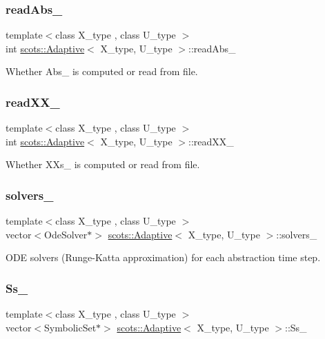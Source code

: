 \subsubsection{\texorpdfstring{read\+Abs\+\_\+}{readAbs\_}}
{\footnotesize\ttfamily template$<$class X\+\_\+type , class U\+\_\+type $>$ \\
int \hyperlink{classscots_1_1Adaptive}{scots\+::\+Adaptive}$<$ X\+\_\+type, U\+\_\+type $>$\+::read\+Abs\+\_\+}

Whether Abs\+\_\+ is computed or read from file. \mbox{\label{classscots_1_1Adaptive_a95926f102459b6ec3525040c791ff359}} 
\subsubsection{\texorpdfstring{read\+X\+X\+\_\+}{readXX\_}}
{\footnotesize\ttfamily template$<$class X\+\_\+type , class U\+\_\+type $>$ \\
int \hyperlink{classscots_1_1Adaptive}{scots\+::\+Adaptive}$<$ X\+\_\+type, U\+\_\+type $>$\+::read\+X\+X\+\_\+}

Whether X\+Xs\+\_\+ is computed or read from file. \mbox{\label{classscots_1_1Adaptive_a0b300511b5f746c7b24ead30dc0ca9ac}} 
\subsubsection{\texorpdfstring{solvers\+\_\+}{solvers\_}}
{\footnotesize\ttfamily template$<$class X\+\_\+type , class U\+\_\+type $>$ \\
vector$<$Ode\+Solver$\ast$$>$ \hyperlink{classscots_1_1Adaptive}{scots\+::\+Adaptive}$<$ X\+\_\+type, U\+\_\+type $>$\+::solvers\+\_\+}

O\+DE solvers (Runge-\/\+Katta approximation) for each abstraction time step. \mbox{\label{classscots_1_1Adaptive_a4afb0056b1ab5f1f73b1740806267044}} 
\subsubsection{\texorpdfstring{Ss\+\_\+}{Ss\_}}
{\footnotesize\ttfamily template$<$class X\+\_\+type , class U\+\_\+type $>$ \\
vector$<$Symbolic\+Set$\ast$$>$ \hyperlink{classscots_1_1Adaptive}{scots\+::\+Adaptive}$<$ X\+\_\+type, U\+\_\+type $>$\+::Ss\+\_\+}

